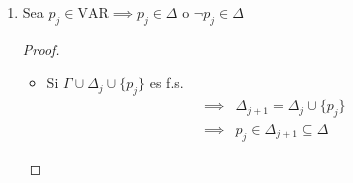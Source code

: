 \begin{itemize}[align=right]
\begin{enumerate}
\begin{proof}
            \begin{itemize}
                \item CB) $n = 0$
                    \begin{gather*}
                         \Gamma \cup \Delta_0 = \Gamma \text{ es f.s.}
                         \notamath{Dato}
                    \end{gather*}
                \item HI) $\Gamma \cup \Delta_n$ es f.s.
                \item T) $\Gamma \cup \Delta_{n+1}$ es f.s.
            \end{itemize}
            \begin{align*}
                 \Gamma \cup \Delta_{n+1} =
                 \begin{cases}
                     \Gamma \cup \Delta_n \cup \{ p_n \} & \text{si } 
                     \underbrace{\Gamma \cup \Delta_n}_{\substack{
                     \text{Por HI}\\\text{es f.s.}}} 
                     \cup \{ p_n \} \text{ es f.s.}\\
                     \Gamma \cup \Delta_n \cup \{ \neg p_n \} & \text{sino}
                 \end{cases} \\
            \end{align*}
            Utilizando el :

            Si $\Gamma \cup \Delta_n \cup \{ p_j \}$ es f.s. 
            $\implies \Gamma \cup \Delta_{n+1} 
            = \Gamma \cup \Delta_n \cup \{ p_n \}$ es f.s.

            Si $\Gamma \cup \Delta_n \cup \{ \neg p_j \}$ es f.s. 
            $\implies \Gamma \cup \Delta_{n+1} 
            = \Gamma \cup \Delta_n \cup \{ \neg p_n \}$ es f.s.
            \end{proof}

            \item Sea $p_j \in \mathrm{VAR} \implies p_j \in \Delta$ o 
                $\neg p_j \in \Delta$

            \begin{proof} \phantom{.}
            
                \begin{itemize}
                    \item Si $\Gamma \cup \Delta_j \cup \{ p_j \}$ es f.s.
                    \begin{align*}
                        \implies& \Delta_{j+1} 
                        = \Delta_j \cup \{ p_j \} \\
                        \implies& p_j \in \Delta_{j+1} \subseteq \Delta
                    \end{align*}
                    

\end{itemize}
\end{proof}
\end{enumerate}
\end{itemize}
